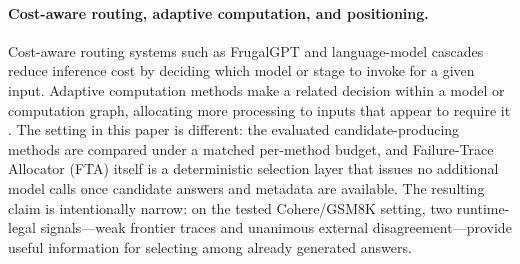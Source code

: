\paragraph{Cost-aware routing, adaptive computation, and positioning.}
Cost-aware routing systems such as FrugalGPT \citep{chen2023frugalgpt} and language-model cascades \citep{dohan2022language} reduce inference cost by deciding which model or stage to invoke for a given input.
Adaptive computation methods make a related decision within a model or computation graph, allocating more processing to inputs that appear to require it \citep{graves2016adaptive}.
The setting in this paper is different: the evaluated candidate-producing methods are compared under a matched per-method budget, and Failure-Trace Allocator (FTA) itself is a deterministic selection layer that issues no additional model calls once candidate answers and metadata are available.
The resulting claim is intentionally narrow: on the tested Cohere/GSM8K setting, two runtime-legal signals---weak frontier traces and unanimous external disagreement---provide useful information for selecting among already generated answers.
